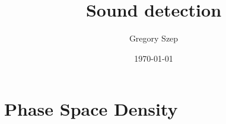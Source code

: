 \documentclass{article}[12pt]
\numberwithin{equation}{section}
\begin{document}
\title{
Sound detection
}

\author{Gregory Szep}
\date{\today}
\maketitle

\section{Phase Space Density} \vspace{-10pt}



\end{document}
